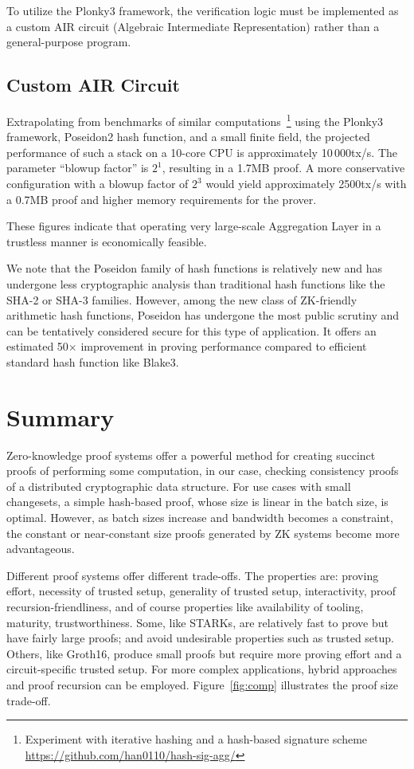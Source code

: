 \documentclass[twocolumn]{article}
\begin{document}
To utilize the Plonky3 framework, the verification logic must be implemented as a custom AIR circuit (Algebraic Intermediate Representation) rather than a general-purpose program.

\subsection{Custom AIR Circuit}
\label{sec:custom-air-circuit}

Extrapolating from benchmarks of similar computations~\footnote{Experiment with iterative hashing and a hash-based signature scheme \url{https://github.com/han0110/hash-sig-agg/}} using the Plonky3 framework, Poseidon2 hash function, and a small finite field, the projected performance of such a stack on a 10-core CPU is approximately 10\,000\;tx/s. The parameter ``blowup factor'' is $2^1$, resulting in a 1.7\;MB proof. A more conservative configuration with a blowup factor of $2^3$ would yield approximately 2500\;tx/s with a 0.7\;MB proof and higher memory requirements for the prover.

These figures indicate that operating very large-scale Aggregation Layer in a trustless manner is economically feasible.

We note that the Poseidon family of hash functions is relatively new and has undergone less cryptographic analysis than traditional hash functions like the SHA-2 or SHA-3 families. However, among the new class of ZK-friendly arithmetic hash functions, Poseidon has undergone the most public scrutiny and can be tentatively considered secure for this type of application. It offers an estimated 50$\times$ improvement in proving performance compared to efficient standard hash function like Blake3.

\section{Summary}

Zero-knowledge proof systems offer a powerful method for creating succinct proofs of performing some computation, in our case, checking consistency proofs of a distributed cryptographic data structure. For use cases with small changesets, a simple hash-based proof, whose size is linear in the batch size, is optimal. However, as batch sizes increase and bandwidth becomes a constraint, the constant or near-constant size proofs generated by ZK systems become more advantageous.

Different proof systems offer different trade-offs. The properties are: proving effort, necessity of trusted setup, generality of trusted setup, interactivity, proof recursion-friendliness, and of course properties like availability of tooling, maturity, trustworthiness. Some, like STARKs, are relatively fast to prove but have fairly large proofs; and avoid undesirable properties such as trusted setup. Others, like Groth16, produce small proofs but require more proving effort and a circuit-specific trusted setup. For more complex applications, hybrid approaches and proof recursion can be employed. Figure~\ref{fig:comp} illustrates the proof size trade-off.
\end{document}
